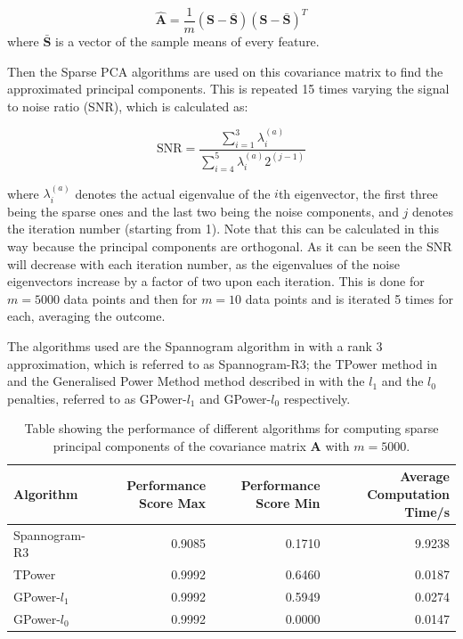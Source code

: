 \documentclass[11pt,a4paper]{article}
\begin{document}
\begin{equation*}
\mathbf{\hat{A}} = \frac{1}{m}\left(\mathbf{S} - \bar{\mathbf{S}}\right)\left(\mathbf{S} - \bar{\mathbf{S}}\right)^T
\end{equation*}
where $\bar{\mathbf{S}}$ is a vector of the sample means of every feature.

Then the Sparse PCA algorithms are used on this covariance matrix to find the approximated principal components. This is repeated 15 times varying the signal to noise ratio (SNR), which is calculated as:

\begin{equation*}
\text{SNR} = \frac{\sum_{i = 1}^3\lambda_i^{(a)}}{\sum_{i = 4}^5\lambda_i^{(a)}2^{(j-1)}}
\end{equation*}

where $\lambda_i^{(a)}$ denotes the actual eigenvalue of the $i$th eigenvector, the first three being the sparse ones and the last two being the noise components, and $j$ denotes the iteration number (starting from 1). Note that this can be calculated in this way because the principal components are orthogonal. As it can be seen the SNR will decrease with each iteration number, as the eigenvalues of the noise eigenvectors increase by a factor of two upon each iteration. This is done for $m=5000$ data points and then for $m=10$ data points and is iterated 5 times for each, averaging the outcome. 

The algorithms used are the Spannogram algorithm in \cite{dimakis} with a rank 3 approximation, which is referred to as Spannogram-R3; the TPower method in \cite{truncpower} and the Generalised Power Method method described in \cite{GPower} with the $l_1$ and the $l_0$ penalties, referred to as GPower-$l_1$ and GPower-$l_0$ respectively.

\begin{table}[H]
\center
\begin{tabular}{|l|r|r|r|}
\hline
Algorithm &  Performance Score Max &  Performance Score Min & Average Computation Time/s\\
\hline
Spannogram-R3 &0.9085 &    0.1710 &   9.9238\\
TPower &    0.9992 &   0.6460&    0.0187 \\
 GPower-$l_1$&   0.9992  &  0.5949&    0.0274\\
 GPower-$l_0$  & 0.9992&         0.0000   & 0.0147\\
\hline

\end{tabular}
\caption{Table showing the performance of different algorithms for computing sparse principal components of the covariance matrix $\mathbf{A}$ with $m=5000$.}
\label{performance_5000}
\end{table}
\end{document}
